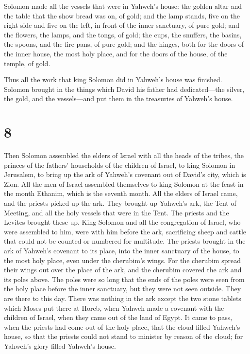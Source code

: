  Solomon made all the vessels that were in Yahweh's house:
the golden altar and the table that the show bread was on, of gold;
 and the lamp stands, five on the right side and five on
the left, in front of the inner sanctuary, of pure gold; and the
flowers, the lamps, and the tongs, of gold;  the cups, the
snuffers, the basins, the spoons, and the fire pans, of pure gold; and
the hinges, both for the doors of the inner house, the most holy place,
and for the doors of the house, of the temple, of gold.

 Thus all the work that king Solomon did in Yahweh's house
was finished. Solomon brought in the things which David his father had
dedicated---the silver, the gold, and the vessels---and put them in the
treasuries of Yahweh's house.

\hypertarget{section-7}{%
\section{8}\label{section-7}}

 Then Solomon assembled the elders of Israel with all the
heads of the tribes, the princes of the fathers' households of the
children of Israel, to king Solomon in Jerusalem, to bring up the ark of
Yahweh's covenant out of David's city, which is Zion.  All
the men of Israel assembled themselves to king Solomon at the feast in
the month Ethanim, which is the seventh month.  All the
elders of Israel came, and the priests picked up the ark. 
They brought up Yahweh's ark, the Tent of Meeting, and all the holy
vessels that were in the Tent. The priests and the Levites brought these
up.  King Solomon and all the congregation of Israel, who
were assembled to him, were with him before the ark, sacrificing sheep
and cattle that could not be counted or numbered for multitude.
 The priests brought in the ark of Yahweh's covenant to its
place, into the inner sanctuary of the house, to the most holy place,
even under the cherubim's wings.  For the cherubim spread
their wings out over the place of the ark, and the cherubim covered the
ark and its poles above.  The poles were so long that the
ends of the poles were seen from the holy place before the inner
sanctuary, but they were not seen outside. They are there to this day.
 There was nothing in the ark except the two stone tablets
which Moses put there at Horeb, when Yahweh made a covenant with the
children of Israel, when they came out of the land of Egypt.
 It came to pass, when the priests had come out of the holy
place, that the cloud filled Yahweh's house,  so that the
priests could not stand to minister by reason of the cloud; for Yahweh's
glory filled Yahweh's house.

